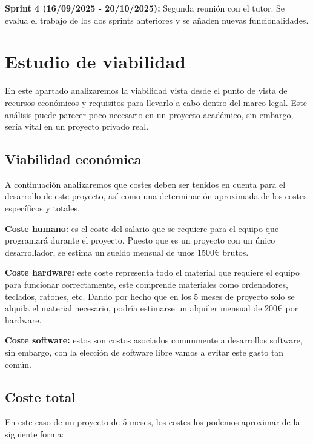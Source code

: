\textbf{Sprint 4 (16/09/2025 - 20/10/2025):} Segunda reunión con el tutor. Se evalua el trabajo de los dos sprints anteriores y se añaden nuevas funcionalidades. 

\section{Estudio de viabilidad}
En este apartado analizaremos la viabilidad vista desde el punto de vista de recursos económicos y requisitos para llevarlo a cabo dentro del marco legal. Este análisis puede parecer poco necesario en un proyecto académico, sin embargo, sería vital en un proyecto privado real.

\subsection{Viabilidad económica}
A continuación analizaremos que costes deben ser tenidos en cuenta para el desarrollo de este proyecto, así como una determinación aproximada de los costes específicos y totales.

\textbf{Coste humano:} es el coste del salario que se requiere para el equipo que programará durante el proyecto. Puesto que es un proyecto con un único desarrollador, se estima un sueldo mensual de unos 1500€ brutos.

\textbf{Coste hardware:} este coste representa todo el material que requiere el equipo para funcionar correctamente, este comprende materiales como ordenadores, teclados, ratones, etc. Dando por hecho que en los 5 meses de proyecto solo se alquila el material necesario, podría estimarse un alquiler mensual de 200€ por hardware.

\textbf{Coste software:} estos son costos asociados comunmente a desarrollos software, sin embargo, con la elección de software libre vamos a evitar este gasto tan común.

\subsection{Coste total}
En este caso de un proyecto de 5 meses, los costes los podemos aproximar de la siguiente forma:

